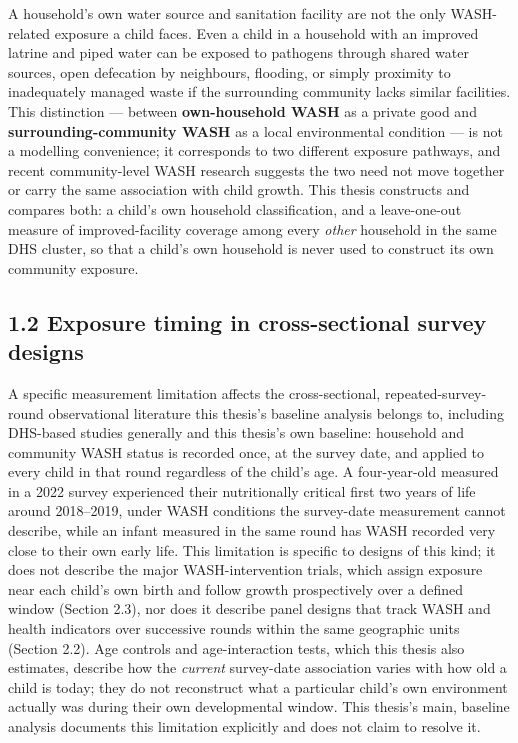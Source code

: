 A household's own water source and sanitation facility are not the only WASH-related exposure a child faces. Even a child in a household with an improved latrine and piped water can be exposed to pathogens through shared water sources, open defecation by neighbours, flooding, or simply proximity to inadequately managed waste if the surrounding community lacks similar facilities. This distinction --- between \textbf{own-household WASH} as a private good and \textbf{surrounding-community WASH} as a local environmental condition --- is not a modelling convenience; it corresponds to two different exposure pathways, and recent community-level WASH research \parencite{Donohue2023,SkoufiasVinha2026} suggests the two need not move together or carry the same association with child growth. This thesis constructs and compares both: a child's own household classification, and a leave-one-out measure of improved-facility coverage among every \textit{other} household in the same DHS cluster, so that a child's own household is never used to construct its own community exposure.

\subsection*{1.2 Exposure timing in cross-sectional survey designs}

A specific measurement limitation affects the cross-sectional, repeated-survey-round observational literature this thesis's baseline analysis belongs to, including DHS-based studies generally \parencite{Rakotomanana2020,Addae2024} and this thesis's own baseline: household and community WASH status is recorded once, at the survey date, and applied to every child in that round regardless of the child's age. A four-year-old measured in a 2022 survey experienced their nutritionally critical first two years of life around 2018--2019, under WASH conditions the survey-date measurement cannot describe, while an infant measured in the same round has WASH recorded very close to their own early life. This limitation is specific to designs of this kind; it does not describe the major WASH-intervention trials, which assign exposure near each child's own birth and follow growth prospectively over a defined window (Section 2.3), nor does it describe panel designs that track WASH and health indicators over successive rounds within the same geographic units (Section 2.2). Age controls and age-interaction tests, which this thesis also estimates, describe how the \textit{current} survey-date association varies with how old a child is today; they do not reconstruct what a particular child's own environment actually was during their own developmental window. This thesis's main, baseline analysis documents this limitation explicitly and does not claim to resolve it.

